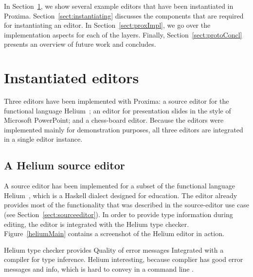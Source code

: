 In Section~\ref{sect:sampleEditors}, we show several example editors that have been instantiated in Proxima. Section~\ref{sect:instantiating} discusses the components that are required for instantiating an editor. In Section~\ref{sect:proxImpl}, we go over the implementation aspects for each of the layers. Finally, Section~\ref{sect:protoConcl} presents an overview of future work and concludes.

\section{Instantiated editors} \label{sect:sampleEditors}
Three editors have been implemented with Proxima: a source editor for the functional language Helium~\cite{heeren03helium}; an editor for presentation slides in the style of Microsoft PowerPoint; and a chess-board editor. Because the editors were implemented mainly for demonstration purposes, all three editors are integrated in a single editor instance.


\subsection{A Helium source editor}



A source editor has been implemented for a subset of the functional language Helium~\cite{heeren03helium}, which is a  Haskell dialect designed for education. The editor already provides most of the functionality that was described in the source-editor use case (see Section~\ref{sect:sourceeditor}). In order to provide type information during editing, the editor is integrated with the Helium type checker. Figure~\ref{heliumMain} contains a screenshot of the Helium editor in action. 

\bc Helium type checker provides Quality of error messages  Integrated with a compiler for type inference. Helium interesting, because complier has good error messages and info, which is hard to convey in a command line . \ec


